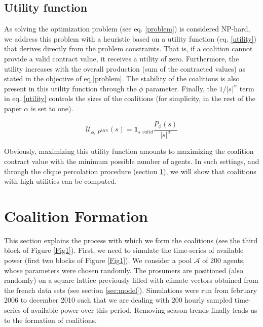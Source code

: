 \documentclass[conference]{IEEEtran}
\begin{document}
\subsection{Utility function}\label{subsec:UtilityFunc}
As solving the optimization problem (see eq. \ref{problem}) is considered NP-hard, we address this problem with a heuristic based on a utility function (eq. \ref{utility}) that derives directly from the problem constraints. That is, if a coalition cannot provide a valid contract value, it receives a utility of zero. Furthermore, the utility increases with the overall production (sum of the contracted values) as stated in the objective of eq.\ref{problem}. The stability of the coalitions is also present in this utility function through the $ \phi $ parameter. Finally, the $ 1/|s|^{\alpha} $ term in eq. \ref{utility} controls the sizes of the coalitions (for simplicity, in the rest of the paper $ \alpha $ is set to one).

\begin{equation}
 \mathcal{U}_{\phi,\ P^{MIN}}(s) = \mathbf{1}_{\textit{s\ valid}} \dfrac{P_{\phi}(s)}{|s|^{\alpha}} 
\label{utility}
\end{equation}

Obviously, maximizing this utility function amounts to maximizing the coalition contract value with the minimum possible number of agents. In such settings, and through the clique percolation procedure (section \ref{sec:forming}), we will show that coalitions with high utilities can be computed.

%
%

\section{Coalition Formation}
\label{sec:forming}

This section explains the process with which we form the coalitions (see the third block of Figure \ref{Fig1}). First, we need to simulate the time-series of available power (first two blocks of Figure \ref{Fig1}). We consider a pool $ \mathcal{A} $ of 200 agents, whose parameters were chosen randomly. The prosumers are positioned (also randomly) on a square lattice previously filled with climate vectors obtained from the french data sets (see section \ref{sec:model}). Simulations were run from february 2006 to december 2010 such that we are dealing with 200 hourly sampled time-series of available power over this period. Removing season trends finally leads us to the formation of coalitions. 
\end{document}
